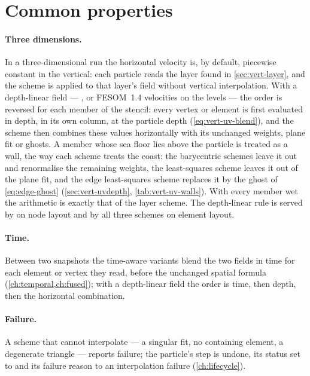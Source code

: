 \section{Common properties}\label{sec:hvel-common}

\paragraph{Three dimensions.} In a three-dimensional run the horizontal velocity is, by default,
piecewise constant in the vertical: each particle reads the layer found in \cref{sec:vert-layer}, and the
scheme is applied to that layer's field without vertical interpolation. With a depth-linear field ---
, or FESOM~1.4 velocities on the levels --- the order is reversed for
each member of the stencil: every vertex or element is first evaluated in depth, in its own column, at the
particle depth (\cref{eq:vert-uv-blend}), and the scheme then combines these values horizontally with its
unchanged weights, plane fit or ghosts. A member whose sea floor lies above the particle is treated as a
wall, the way each scheme treats the coast: the barycentric schemes leave it out and renormalise the
remaining weights, the least-squares scheme leaves it out of the plane fit, and the edge least-squares
scheme replaces it by the ghost of \cref{eq:edge-ghost} (\cref{sec:vert-uvdepth},
\cref{tab:vert-uv-walls}). With every member wet the arithmetic is exactly that of the layer scheme. The
depth-linear rule is served by  on node layout and by all three schemes on element
layout.

\paragraph{Time.} Between two snapshots the time-aware variants blend the two fields in time for each
element or vertex they read, before the unchanged spatial formula (\cref{ch:temporal,ch:fused}); with a
depth-linear field the order is time, then depth, then the horizontal combination.

\paragraph{Failure.} A scheme that cannot interpolate --- a singular fit, no containing element, a
degenerate triangle --- reports failure; the particle's step is undone, its status set to
 and its failure reason to an interpolation failure (\cref{ch:lifecycle}).

